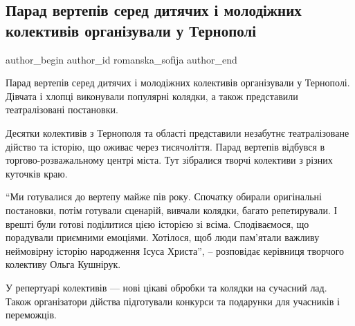  
 
 
 
 
 
\subsection{Парад вертепів серед дитячих і молодіжних колективів організували у Тернополі}
\label{sec:25_01_2022.stz.news.ua.zzte.1.parad_vertepov_ternopol}
 
\ifcmt
 author_begin
   author_id romanska_sofіja
 author_end
\fi

\begin{zznagolos}
Парад вертепів серед дитячих і молодіжних колективів організували у Тернополі.
Дівчата і хлопці виконували популярні колядки, а також представили
театралізовані постановки.
\end{zznagolos}


Десятки колективів з Тернополя та області представили незабутнє театралізоване
дійство та історію, що оживає через тисячоліття. Парад вертепів відбувся в
торгово-розважальному центрі міста. Тут зібралися творчі колективи з різних
куточків краю.


\enquote{Ми готувалися до вертепу майже пів року. Спочатку обирали оригінальні
постановки, потім готували сценарій, вивчали колядки, багато репетирували. І
врешті були готові поділитися цією історією зі всіма. Сподіваємося, що
порадували приємними емоціями. Хотілося, щоб люди пам’ятали важливу неймовірну
історію народження Ісуса Христа}, – розповідає керівниця творчого колективу
Ольга Кушнірук.


У репертуарі колективів —  нові цікаві обробки та колядки на сучасний лад.
Також організатори дійства підготували конкурси та подарунки для учасників і
переможців.
